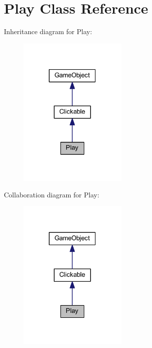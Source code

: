 \hypertarget{class_play}{\section{Play Class Reference}
\label{class_play}
}


Inheritance diagram for Play\+:\nopagebreak
\begin{figure}[H]
\begin{center}
\leavevmode
\includegraphics[width=151pt]{class_play__inherit__graph}
\end{center}
\end{figure}


Collaboration diagram for Play\+:\nopagebreak
\begin{figure}[H]
\begin{center}
\leavevmode
\includegraphics[width=151pt]{class_play__coll__graph}
\end{center}
\end{figure}
